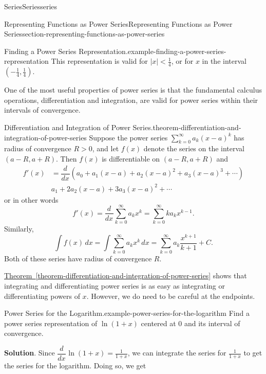 \documentclass[oneside,10pt,]{book}
\numberwithin{equation}{section}
\newcommand{\dv}[3][]{\dfrac{d^{#1} #2}{d #3^{#1}}}
\newcommand{\lt}{<}
\newcommand{\gt}{>}
\newcommand{\amp}{&}
\begin{document}
\begin{chapterptx}{Series}{}{Series}{}{}{series}
\begin{sectionptx}{Representing Functions as Power Series}{}{Representing Functions as Power Series}{}{}{section-representing-functions-as-power-series}
\begin{example}{Finding a Power Series Representation.}{example-finding-a-power-series-representation}
This representation is valid for \(|x| \lt \frac{1}{4}\), or for \(x\) in the interval \((-\frac{1}{4}, \frac{1}{4})\).%
\end{example}
\hypertarget{p-954}{}%
One of the most useful properties of power series is that the fundamental calculus operations, differentiation and integration, are valid for power series within their intervals of convergence.%
\begin{theorem}{Differentiation and Integration of Power Series.}{}{theorem-differentiation-and-integration-of-power-series}%
\hypertarget{p-955}{}%
Suppose the power series \(\sum_{k = 0}^{\infty}a_{k}(x - a)^{k}\) has radius of convergence \(R \gt 0\), and let \(f(x)\) denote the series on the interval \((a - R, a + R)\). Then \(f(x)\) is differentiable on \((a - R, a + R)\) and%
\begin{align*}
f'(x) \amp = \dv{}{x}\left(a_{0} + a_{1}(x - a) + a_{2}(x - a)^{2} + a_{3}(x - a)^{3} + \cdots\right)\\
\amp a_{1} + 2a_{2}(x - a) + 3a_{3}(x - a)^{2} + \cdots 
\end{align*}
or in other words%
\begin{equation*}
f'(x) = \dv{}{x}\sum_{k=0}^{\infty}a_{k}x^{k} = \sum_{k=0}^{\infty} ka_{k}x^{k-1}\text{.}
\end{equation*}
Similarly,%
\begin{equation*}
\int f(x)\,dx = \int \sum_{k = 0}^{\infty}a_{k}x^{k}\,dx = \sum_{k = 0}^{\infty} a_{k}\frac{x^{k + 1}}{k + 1} + C\text{.}
\end{equation*}
Both of these series have radius of convergence \(R\).%
\end{theorem}
\hypertarget{p-956}{}%
\hyperref[theorem-differentiation-and-integration-of-power-series]{Theorem~\ref{theorem-differentiation-and-integration-of-power-series}} shows that integrating and differentiating power series is as easy as integrating or differentiating powers of \(x\). However, we do need to be careful at the endpoints.%
\begin{example}{Power Series for the Logarithm.}{example-power-series-for-the-logarithm}%
\hypertarget{p-957}{}%
Find a power series representation of \(\ln(1 + x)\) centered at \(0\) and its interval of convergence.%
\par\smallskip%
\noindent\textbf{Solution}.\hypertarget{solution-194}{}\quad%
\hypertarget{p-958}{}%
Since \(\dv{}{x}\ln(1 + x) = \frac{1}{1 + x}\), we can integrate the series for \(\frac{1}{1 + x}\) to get the series for the logarithm. Doing so, we get%
\begin{align*}

\end{align*}
\end{example}
\end{sectionptx}
\end{chapterptx}
\end{document}
